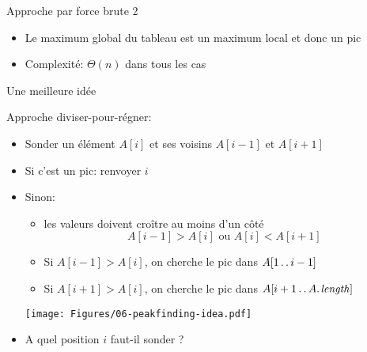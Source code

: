 \begin{frame}{Approche par force brute 2}
\begin{itemize}
\item Le maximum global du tableau est un maximum local et donc un pic

\bigskip

\begin{center}
{\small
{}
}
\end{center}

\bigskip

\item Complexité: $\Theta(n)$ dans tous les cas
\end{itemize}

\end{frame}

\begin{frame}{Une meilleure idée}

Approche diviser-pour-régner:
\begin{itemize}
\item Sonder un élément $A[i]$ et ses voisins $A[i-1]$ et $A[i+1]$
\item Si c'est un pic: renvoyer $i$
\item Sinon:
\begin{itemize}
\item les valeurs doivent croître au moins d'un côté
$$A[i-1]>A[i]\mbox{ ou }A[i]<A[i+1]$$
\item Si $A[i-1]>A[i]$, on cherche le pic dans $A[1\mathinner{\ldotp\ldotp} i-1]$
\item Si $A[i+1]>A[i]$, on cherche le pic dans $A[i+1\twodots \attrib{A}{length}]$
\end{itemize}

\bigskip

\centerline{\texttt{[image: Figures/06-peakfinding-idea.pdf]}}

\item A quel position $i$ faut-il sonder ?
\end{itemize}

\end{frame}

